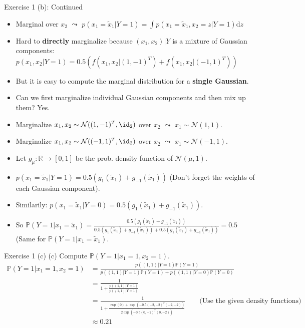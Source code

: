 \documentclass[aspectratio=169]{beamer}
\newcommand{\prob}[1]{\mathbb{P}\left(#1\right)}
\newcommand{\xone}{x_1}
\newcommand{\xtwo}{x_2}
\newcommand{\txone}{\tilde{x}_1}
\begin{document}
\begin{frame}{Exercise 1 (b): Continued}
	\begin{itemize}
		\item<1-> Marginal over $x_2$ $\leadsto$ $p(\xone = \txone | Y=1) = \int p(\xone = \txone, \xtwo = z| Y=1) \mathrm{d}z$
		\item<2-> Hard to \textbf{directly} marginalize because $(\xone, \xtwo) | Y$ is a mixture of Gaussian components: $p(x_1, x_2 | Y=1) = \mathbf{0.5} (f(x_1, x_2 | (1, -1 )^T) + f(x_1, x_2 |(-1, 1)^T))$
		\item<3-> But it is easy to compute the marginal distribution for a \textbf{single Gaussian}.
		\item<4-> Can we first marginalize individual Gaussian components and then mix up them? Yes.
		\item<5-> Marginalize $x_1, x_2\sim \mathcal{N}((1, -1 )^T, \id_2)$ over $x_2$ $\leadsto$ $x_1 \sim \mathcal{N}(1, 1)$. 
		\item<6-> Marginalize $x_1, x_2  \sim \mathcal{N}((-1, 1 )^T, \id_2)$ over $x_2$ $\leadsto$ $x_1 \sim \mathcal{N}(-1, 1)$. 
		\item<7-> Let $g_\mu: \mathbb{R} \rightarrow [0, 1]$ be the prob. density function of $\mathcal{N}(\mu, 1)$.
		\item<8-> $p(\xone = \txone | Y=1) = \mathbf{0.5} (g_{1}(\txone) + g_{-1}(\txone))$ \qquad (Don't forget the weights of each Gaussian component).
		\item<9-> Similarily: $p(\xone = \txone | Y=0) = \mathbf{0.5} (g_{1}(\txone) + g_{-1}(\txone))$.
		\item<10-> So $\prob{Y=1 | \xone = \txone} = \frac{ \mathbf{0.5} (g_{1}(\txone) + g_{-1}(\txone))}{ \mathbf{0.5} (g_{1}(\txone) + g_{-1}(\txone)) +  \mathbf{0.5} (g_{1}(\txone) + g_{-1}(\txone))} = 0.5$ \quad (Same for $\prob{Y=1 | \xone = \txone}$.
	\end{itemize}
\end{frame}

\begin{frame}{Exercise 1 (c)}
	(c) Compute $\prob{Y=1 | \xone = 1, \xtwo = 1}$.
	\small 
	\begin{align*}
		\prob{Y=1 | \xone = 1, \xtwo = 1} &= \frac{p((1, 1) | Y=1) \prob{Y=1}}{p((1, 1) | Y=1) \prob{Y=1} + p((1, 1) | Y=0) \prob{Y=0}} \\
		&= \frac{1}{1 + \frac{p((1, 1) | Y=1)}{p((1, 1) | Y=1)}} \\
		&= \frac{1}{1 + \frac{\exp(0) + \exp(-0.5 (-2, -2)^T (-2, -2))}{2 \exp(-0.5 (0, -2)^T (0, -2))}} \qquad \text{(Use the given density functions)}\\
		&\approx 0.21
	\end{align*}
\end{frame}
\end{document}

